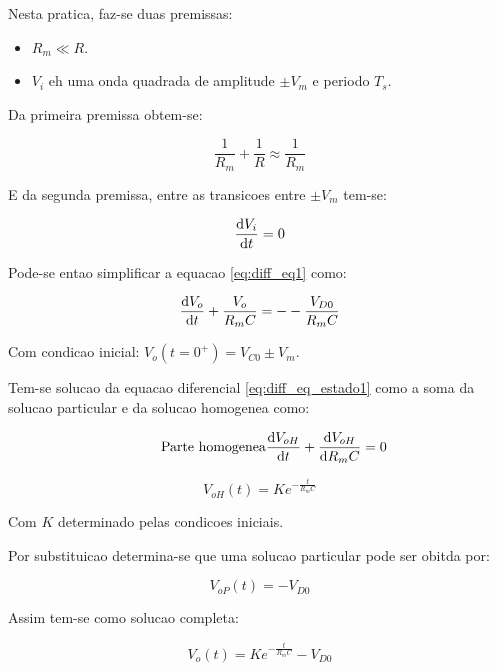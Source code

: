 Nesta pratica, faz-se duas premissas:

\begin{itemize}
    \item $R_m \ll R$. \\
    \item  $V_i$ eh uma onda quadrada de amplitude $\pm V_m$ e periodo $T_s$.
\end{itemize}

Da primeira premissa obtem-se:

\begin{equation}
    \frac{1}{R_m} + \frac{1}{R} \approx \frac{1}{R_m}
\end{equation}

E da segunda premissa, entre as transicoes entre $\pm V_m$ tem-se:

\begin{equation}
    \frac{\mathrm d V_i}{\mathrm d t} = 0
\end{equation}

Pode-se entao simplificar a equacao \ref{eq:diff_eq1} como:

\begin{equation}
    \label{eq:diff_eq_estado1}
    \frac{\mathrm d V_o}{\mathrm d t} + \frac{V_o}{R_m C}= - -\frac{V_{D0}}{R_m C}
\end{equation}

Com condicao inicial: $V_o(t = 0^{+}) = V_{C0} \pm V_m$.

\hfill

Tem-se solucao da equacao diferencial \ref{eq:diff_eq_estado1} como a soma da solucao particular e da solucao homogenea como:

\begin{equation}
    \tag*{Parte homogenea}
    \frac{\mathrm d V_{oH}}{\mathrm d t} + \frac{\mathrm d V_{oH}}{\mathrm d R_m C} = 0
\end{equation}

\begin{equation}
    \tag*{Solucao generica}
    V_{oH}(t) = K e^{-\frac{t}{R_m C}}
\end{equation}

Com $K$ determinado pelas condicoes iniciais.

Por substituicao determina-se que uma solucao particular pode ser obitda por:

\begin{equation}
    V_{oP}(t) = - V_{D0}
\end{equation}

Assim tem-se como solucao completa:

\begin{equation}
    \tag*{Solucao completa}
    \label{eq:solucao_completa1}
    V_o(t) = K e^{-\frac{t}{R_m C}} - V_{D0}
\end{equation}



